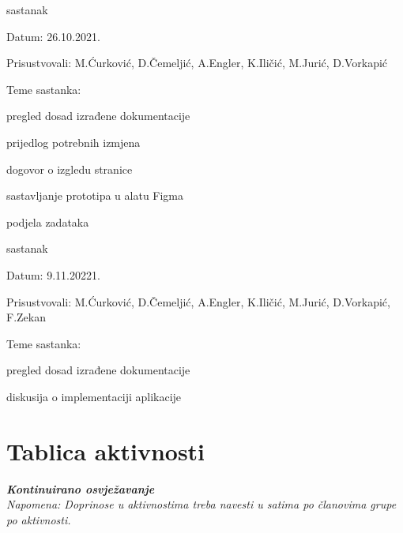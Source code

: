 \begin{packed_enum}
			\item  sastanak
			\item[] \begin{packed_item}
				\item Datum: 26.10.2021.
				\item Prisustvovali: M.Ćurković, D.Čemeljić, A.Engler, K.Iličić, M.Jurić, D.Vorkapić
				\item Teme sastanka:
				\begin{packed_item}
					\item  pregled dosad izrađene dokumentacije
					\item  prijedlog potrebnih izmjena
					\item  dogovor o izgledu stranice
					\item  sastavljanje prototipa u alatu Figma
					\item  podjela zadataka
				\end{packed_item}
			\end{packed_item}
		
			\item  sastanak
			\item[] \begin{packed_item}
				\item Datum: 9.11.20221.
				\item Prisustvovali: M.Ćurković, D.Čemeljić, A.Engler, K.Iličić, M.Jurić, D.Vorkapić, F.Zekan
				\item Teme sastanka:
				\begin{packed_item}
					\item  pregled dosad izrađene dokumentacije
					\item  diskusija o implementaciji aplikacije
				\end{packed_item}
			\end{packed_item}
			
			
		\end{packed_enum}
		
		\eject
		\section*{Tablica aktivnosti}
		
			\textbf{\textit{Kontinuirano osvježavanje}}\\
			
			 \textit{Napomena: Doprinose u aktivnostima treba navesti u satima po članovima grupe po aktivnosti.}

